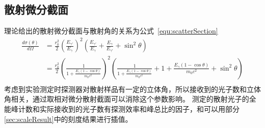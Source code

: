 \documentclass[10pt]{ctexart}
\begin{document}
\subsection{散射微分截面}
理论给出的散射微分截面与散射角的关系为公式~\ref{equ:scatterSection}
\begin{align}
    \frac{d\sigma(\theta)}{d\Omega}&=\frac{r_0^2}{2}(\frac{E_{\gamma'}}{E_\gamma})^2(\frac{E_{\gamma'}}{E_{\gamma}}+\frac{E_{\gamma}}{E_{\gamma'}}+\sin^2{\theta})\\
    &=\frac{r_0^2}{2}(\frac{1}{1+\frac{E_\gamma(1-\cos{\theta})}{m_0c^2}})^2(\frac{1}{1+\frac{E_\gamma(1-\cos{\theta})}{m_0c^2}}+1+\frac{E_\gamma(1-\cos{\theta})}{m_0c^2}+\sin^2{\theta})\\
    \label{equ:scatterSection}
\end{align}
考虑到实验测定时探测器对散射样品有一定的立体角，所以接收到的光子数和立体角相关，通过取相对微分散射截面可以消除这个参数影响。
测定的散射光子的全能峰计数和实际接收到的光子数有探测效率和峰总比的因子，和可以用部分\ref{sec:scaleResult}中的刻度结果进行插值。
\end{document}
